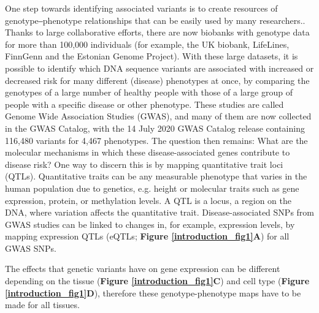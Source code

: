 One step towards identifying associated variants is to create resources of genotype‒phenotype relationships that can be easily used by many researchers.\cite{claussnitzerBriefHistoryHuman2020}. Thanks to large collaborative efforts, there are now biobanks with genotype data for more than 100,000 individuals (for example, the UK biobank\cite{sudlowUKBiobankOpen2015}, LifeLines\cite{tigchelaarCohortProfileLifeLines2015}, FinnGenn\cite{fingennFinnGenDocumentationR32020} and the Estonian Genome Project\cite{metspaluEstonianGenomeProject2004}). With these large datasets, it is possible to identify which DNA sequence variants are associated with increased or decreased risk for many different (disease) phenotypes at once, by comparing the genotypes of a large number of healthy people with those of a large group of people with a specific disease or other phenotype. These studies are called Genome Wide Association Studies (GWAS), and many of them are now collected in the GWAS Catalog\cite{bunielloNHGRIEBIGWASCatalog2019}, with the 14 July 2020 GWAS Catalog release containing 116,480 variants for 4,467 phenotypes. The question then remains: What are the molecular mechanisms in which these disease-associated genes contribute to disease risk? One way to discern this is by mapping quantitative trait loci\cite{membersofthecomplextraitconsortiumNatureIdentificationQuantitative2003} (QTLs). Quantitative traits can be any measurable phenotype that varies in the human population due to genetics, e.g. height or molecular traits such as gene expression, protein, or methylation levels. A QTL is a locus, a region on the DNA, where variation affects the quantitative trait. Disease-associated SNPs from GWAS studies can be linked to changes in, for example, expression levels, by mapping expression QTLs (eQTLs; \textbf{Figure \ref{introduction_fig1}A}) for all GWAS SNPs.


The effects that genetic variants have on gene expression can be different depending on the tissue (\textbf{Figure \ref{introduction_fig1}C}) and cell type (\textbf{Figure \ref{introduction_fig1}D}), therefore these genotype-phenotype maps have to be made for all tissues. 


